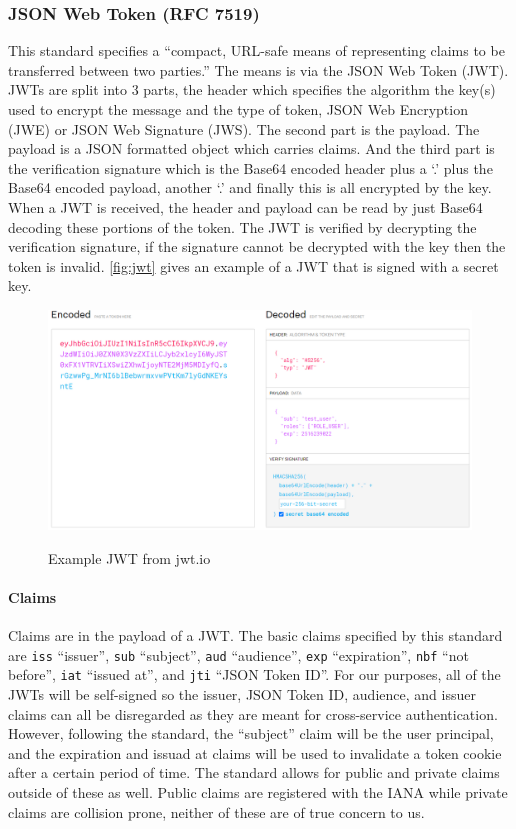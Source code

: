 \subsubsection{JSON Web Token (RFC 7519)}
This standard specifies a ``compact, URL-safe means of representing claims to be transferred between two parties.'' The means is via the JSON Web Token (JWT). JWTs are split into 3 parts, the header which specifies the algorithm the key(s) used to encrypt the message and the type of token, JSON Web Encryption (JWE) or JSON Web Signature (JWS). The second part is the payload. The payload is a JSON formatted object which carries claims. And the third part is the verification signature which is the Base64 encoded header plus a `.' plus the Base64 encoded payload, another `.' and finally this is all encrypted by the key. When a JWT is received, the header and payload can be read by just Base64 decoding these portions of the token. The JWT is verified by decrypting the verification signature, if the signature cannot be decrypted with the key then the token is invalid. \autoref{fig:jwt} gives an example of a JWT that is signed with a secret key.
\begin{figure}[H]
\centering
\caption{Example JWT from jwt.io}
\includegraphics[width=\textwidth]{images/jwt.png}
\label{fig:jwt}
\end{figure}

\paragraph{Claims}
Claims are in the payload of a JWT. The basic claims specified by this standard are \verb|iss| ``issuer'', \verb|sub| ``subject'', \verb|aud| ``audience'', \verb|exp| ``expiration'', \verb|nbf| ``not before'', \verb|iat| ``issued at'', and \verb|jti| ``JSON Token ID''. For our purposes, all of the JWTs will be self-signed so the issuer, JSON Token ID, audience, and issuer claims can all be disregarded as they are meant for cross-service authentication. However, following the standard, the ``subject'' claim will be the user principal, and the expiration and issuad at claims will be used to invalidate a token cookie after a certain period of time. The standard allows for public and private claims outside of these as well. Public claims are registered with the IANA while private claims are collision prone, neither of these are of true concern to us.
